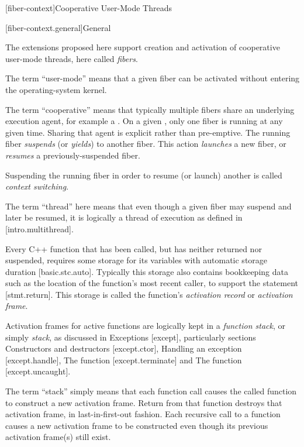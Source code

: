 \newpage

\setcounter{section}{33}
\setcounter{subsection}{6}

\label{api}

[fiber-context]{Cooperative User-Mode Threads}

[fiber-context.general]{General}

The extensions proposed here support creation and activation of cooperative
user-mode threads, here called \emph{fibers}.

The term ``user-mode'' means that a given fiber can be activated without
entering the operating-system kernel.

The term ``cooperative'' means that typically multiple fibers share an
underlying execution agent, for example a . On a
given , only one fiber is running at any given time. Sharing
that agent is explicit rather than pre-emptive. The running
fiber \emph{suspends} (or \emph{yields}) to another fiber. This
action \emph{launches} a new fiber, or \emph{resumes} a previously-suspended
fiber.

Suspending the running fiber in order to resume (or launch) another is
called \emph{context switching}.

The term ``thread'' here means that even though a given fiber may suspend and
later be resumed, it is logically a thread of execution as defined in
[intro.multithread].

Every C++ function that has been called, but has neither returned nor
suspended, requires some storage for its variables with automatic storage
duration [basic.stc.auto]. Typically this storage also contains bookkeeping
data such as the location of the function's most recent caller, to support
the  statement [stmt.return]. This storage is called the
function's \emph{activation record} or \emph{activation frame}.

Activation frames for active functions are logically kept in a \emph{function
stack}, or simply \emph{stack}, as discussed in Exceptions [except],
particularly sections Constructors and destructors [except.ctor], Handling an
exception [except.handle], The  function
[except.terminate] and The  function
[except.uncaught].

The term ``stack'' simply means that each function call causes the called
function to construct a new activation frame. Return from that function
destroys that activation frame, in last-in-first-out fashion. Each recursive
call to a function causes a new activation frame to be constructed even though
its previous activation frame(s) still exist.


